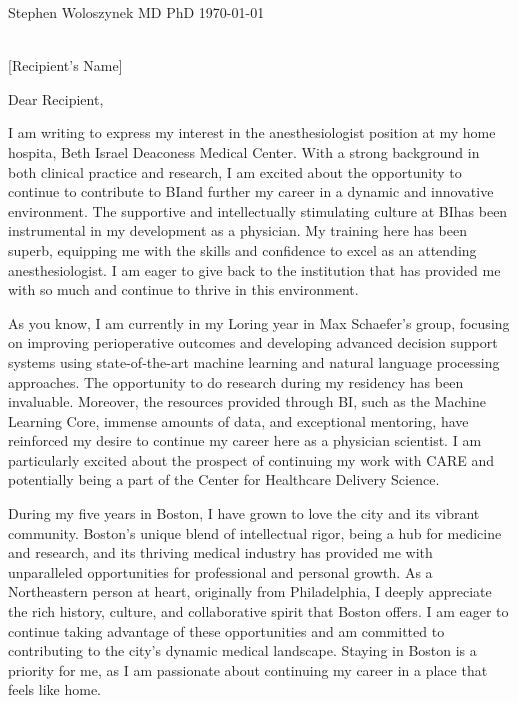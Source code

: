 \documentclass[12pt]{letter}
\newcommand{\recip}{Recipient}
\newcommand{\dept}{Dept. of Anesthesia}
\newcommand{\hosp}{Beth Israel Deaconess Medical Center}
\newcommand{\hospshort}{BI}
\newcommand{\addr}{330 Brookline Ave \\ Boston, MA 02215}
\begin{document}
\date{}

\begin{letter}{
\normalsize{Stephen Woloszynek MD PhD} \hfill \normalsize{\today} \\
\vspace{.1cm}
\fontsize{8.5}{10}\selectfont{
235 Old Colony Ave. Unit 224 \\
Boston, MA, 02127 \\
(215) 910-0152 \\
stephenwoloszynek@gmail.com} \\

\vspace{1cm}

\normalsize{[Recipient's Name]} \\
\vspace{.1cm}
\fontsize{8.5}{10}\selectfont{\dept \\
\hosp \\
\addr}
}


\opening{Dear \recip,}
\vspace{.2cm}
I am writing to express my interest in the anesthesiologist position at my home hospita, \hosp. With a strong background in both clinical practice and research, I am excited about the opportunity to continue to contribute to \hospshort and further my career in a dynamic and innovative environment. The supportive and intellectually stimulating culture at \hospshort has been instrumental in my development as a physician. My training here has been superb, equipping me with the skills and confidence to excel as an attending anesthesiologist. I am eager to give back to the institution that has provided me with so much and continue to thrive in this environment.

As you know, I am currently in my Loring year in Max Schaefer's group, focusing on improving perioperative outcomes and developing advanced decision support systems using state-of-the-art machine learning and natural language processing approaches. The opportunity to do research during my residency has been invaluable. Moreover, the resources provided through \hospshort, such as the Machine Learning Core, immense amounts of data, and exceptional mentoring, have reinforced my desire to continue my career here as a physician scientist. I am particularly excited about the prospect of continuing my work with CARE and potentially being a part of the Center for Healthcare Delivery Science.

During my five years in Boston, I have grown to love the city and its vibrant community. Boston’s unique blend of intellectual rigor, being a hub for medicine and research, and its thriving medical industry has provided me with unparalleled opportunities for professional and personal growth. As a Northeastern person at heart, originally from Philadelphia, I deeply appreciate the rich history, culture, and collaborative spirit that Boston offers. I am eager to continue taking advantage of these opportunities and am committed to contributing to the city’s dynamic medical landscape. Staying in Boston is a priority for me, as I am passionate about continuing my career in a place that feels like home.


\end{letter}
\end{document}
